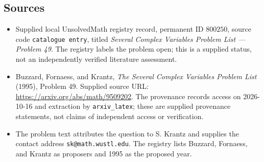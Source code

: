 \documentclass[11pt]{article}
\begin{document}
\subsection{Sources}
\begin{itemize}
\item Supplied local UnsolvedMath registry record, permanent ID \(800250\), source code \texttt{catalogue entry}, titled \emph{Several Complex Variables Problem List --- Problem 49}. The registry labels the problem open; this is a supplied status, not an independently verified literature assessment.
\item Buzzard, Fornaess, and Krantz, \emph{The Several Complex Variables Problem List} (1995), Problem 49. Supplied source URL: \url{https://arxiv.org/abs/math/9509202}. The provenance records access on 2026-10-16 and extraction by \texttt{arxiv\_latex}; these are supplied provenance statements, not claims of independent access or verification.
\item The problem text attributes the question to S. Krantz and supplies the contact address \texttt{sk@math.wustl.edu}. The registry lists Buzzard, Fornaess, and Krantz as proposers and 1995 as the proposed year.
\end{itemize}
\end{document}
